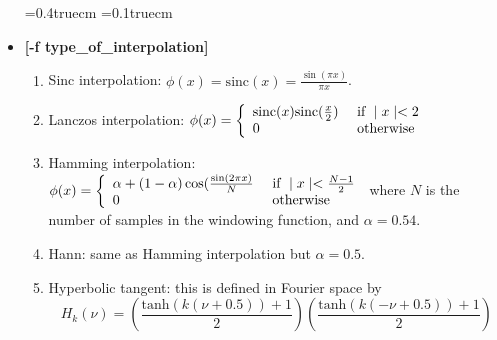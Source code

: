 \begin{itemize}     
\baselineskip=0.4truecm
\itemsep=0.1truecm
\item {\bf [-f type\_of\_interpolation] }
\begin{enumerate}
\baselineskip=0.4truecm
\itemsep=0.1truecm
\item  Sinc interpolation: $\phi(x) = \mathrm{sinc}(x) = \frac{\sin(\pi x)}{\pi x}$.
\item  Lanczos interpolation: 
$
\phi(x) = \left\{
 \begin{array}{ll}
     \mathrm{sinc}(x) \mathrm{sinc}({x \over 2})   &  \mbox{ if }  \mid x \mid  < 2    \\
    0   &   \mbox{ otherwise}
  \end{array}
  \right. 
$
\item  Hamming interpolation: 
$
\phi(x) = \left\{
 \begin{array}{ll}
     \alpha + (1-\alpha) \cos(\frac{\sin(2 \pi x)}{N}     &  \mbox{ if } \mid x  \mid < {N-1 \over 2}     \\
    0   &  \mbox{  otherwise}
  \end{array}
  \right. 
$
where $N$ is the number of samples 
in the windowing function, and $\alpha=0.54$.
\item  Hann: same as Hamming interpolation but $\alpha = 0.5$.
\item  Hyperbolic tangent: this is defined in Fourier space by 
\[
H_k(\nu) = \left( \frac{\mathrm{tanh}(k(\nu + 0.5)) + 1}{2} \right)
      \left( \frac{\mathrm{tanh}(k(-\nu + 0.5)) + 1}{2} \right)
\]


\end{enumerate}
\end{itemize}
